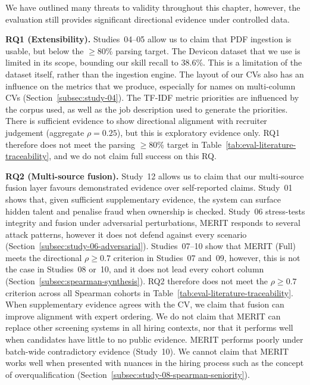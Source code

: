 We have outlined many threats to validity throughout this chapter, however, 
the evaluation still provides significant directional evidence under controlled data.

\textbf{RQ1 (Extensibility).}
Studies~04--05 allow us to claim that PDF ingestion is usable, but below the $\geq 80\%$ parsing target.
The Devicon dataset that we use is limited in its scope, bounding our skill recall to 38.6\%.
This is a limitation of the dataset itself, rather than the ingestion engine. The layout of our CVs also has
an influence on the metrics that we produce, especially for names on multi-column CVs (Section~\ref{subsec:study-04}).
The TF-IDF metric priorities are influenced by the corpus used, as well as the job description used to generate the priorities.
There is sufficient evidence to show directional alignment with recruiter judgement (aggregate $\rho = 0.25$), but this is exploratory evidence only.
RQ1 therefore does not meet the parsing $\geq 80\%$ target in Table~\ref{tab:eval-literature-traceability}, and we do not claim full success on this RQ.

\textbf{RQ2 (Multi-source fusion).}
Study~12 allows us to claim that our multi-source fusion layer favours demonstrated evidence over self-reported claims.
Study~01 shows that, given sufficient supplementary evidence, the system can surface hidden talent and penalise fraud when ownership is checked.
Study~06 stress-tests integrity and fusion under adversarial perturbations, MERIT responds to several attack patterns, however it does not defend against
every scenario (Section~\ref{subsec:study-06-adversarial}).
Studies~07--10 show that MERIT (Full) meets the directional $\rho \geq 0.7$ criterion in Studies~07 and~09,
however, this is not the case in Studies~08 or~10, and it does not lead every cohort column (Section~\ref{subsec:spearman-synthesis}).
RQ2 therefore does not meet the $\rho \geq 0.7$ criterion across all Spearman cohorts in Table~\ref{tab:eval-literature-traceability}.
When supplementary evidence agrees with the CV, we claim that fusion can improve alignment with expert ordering.
We do not claim that MERIT can replace other screening systems in all hiring contexts, nor that it performs well when candidates have little to no public evidence.
MERIT performs poorly under batch-wide contradictory evidence (Study~10).
We cannot claim that MERIT works well when presented with nuances in the hiring process such as the concept of overqualification 
(Section~\ref{subsec:study-08-spearman-seniority}).

